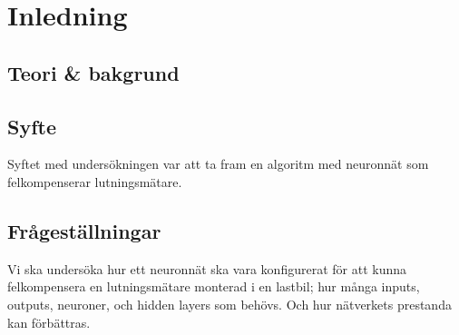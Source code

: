 \section{Inledning}
\subsection{Teori \& bakgrund}


\subsection{Syfte}
Syftet med  undersökningen var att ta fram en algoritm med neuronnät som
felkompenserar lutningsmätare.

\subsection{Frågeställningar}
Vi ska undersöka hur ett neuronnät ska vara konfigurerat för att kunna
felkompensera en lutningsmätare monterad i en lastbil; hur många inputs,
outputs, neuroner, och hidden layers som behövs.
Och hur nätverkets prestanda kan förbättras.
